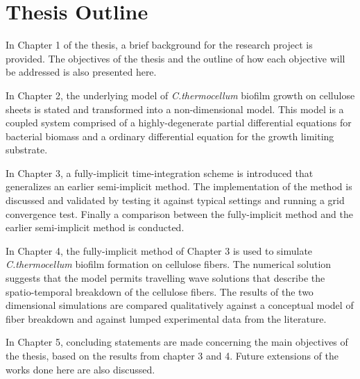 \section{Thesis Outline}

In Chapter 1 of the thesis, a brief background for the research project is provided.
The objectives of the thesis and the outline of how each objective will be addressed is also presented here.

In Chapter 2, the underlying model of \textit{C.thermocellum} biofilm growth on cellulose sheets is stated and transformed into a non-dimensional model.
This model is a coupled system comprised of a highly-degenerate partial differential equations for bacterial biomass and a ordinary differential equation for the growth limiting substrate.

In Chapter 3, a fully-implicit time-integration scheme is introduced that generalizes an earlier semi-implicit method.
The implementation of the method is discussed and validated by testing it against typical settings and running a grid convergence test.
Finally a comparison between the fully-implicit method and the earlier semi-implicit method is conducted.

In Chapter 4, the fully-implicit method of Chapter 3 is used to simulate \textit{C.thermocellum} biofilm formation on cellulose fibers. 
The numerical solution suggests that the model permits travelling wave solutions that describe the spatio-temporal breakdown of the cellulose fibers.
The results of the two dimensional simulations are compared qualitatively against a conceptual model of fiber breakdown and against lumped experimental data from the literature.

In Chapter 5, concluding statements are made concerning the main objectives of the thesis, based on the results from chapter 3 and 4.
Future extensions of the works done here are also discussed.
